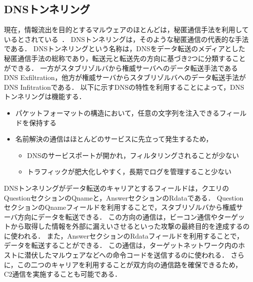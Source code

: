 \subsection{DNSトンネリング}
\label{sec:dns-tunneling}
現在，情報流出を目的とするマルウェアのほとんどは，秘匿通信手法を利用しているとされている~\cite{asaf}．
DNSトンネリングは，そのような秘匿通信の代表的な手法である．
DNSトンネリングという名称は，DNSをデータ転送のメディアとした秘匿通信手法の総称であり，転送元と転送先の方向に基づき2つに分類することができる．
一方がスタブリゾルバから権威サーバへのデータ転送手法であるDNS Exfiltration，他方が権威サーバからスタブリゾルバへのデータ転送手法がDNS Infitrationである．
以下に示すDNSの特性を利用することによって，DNSトンネリングは機能する．

\begin{itemize}
 \setlength{\itemsep}{0pt}
 \item パケットフォーマットの構造において，任意の文字列を注入できるフィールドを保持する
 \item 名前解決の通信はほとんどのサービスに先立って発生するため，
	\begin{itemize}
	 \vspace{-10pt}
   \setlength{\itemsep}{0pt}
	 \item DNSのサービスポートが開かれ，フィルタリングされることが少ない
	 \item トラフィックが肥大化しやすく，長期でログを管理すること少ない
	\end{itemize}
\end{itemize}

DNSトンネリングがデータ転送のキャリアとするフィールドは，クエリのQuestionセクションのQnameと，AnswerセクションのRdataである．
QuestionセクションのQnameフィールドを利用することで，スタブリゾルバから権威サーバ方向にデータを転送できる．
この方向の通信は，ビーコン通信やターゲットから取得した情報を外部に漏えいさせるといった攻撃の最終目的を達成するのに使われる．
また，AnswerセクションのRdataフィールドを利用することで，データを転送することができる．
この通信は，ターゲットネットワーク内のホストに潜伏したマルウェアなどへの命令コードを送信するのに使われる．
さらに，この二つのキャリアを利用することが双方向の通信路を確保できるため，C2通信を実施することも可能である．

